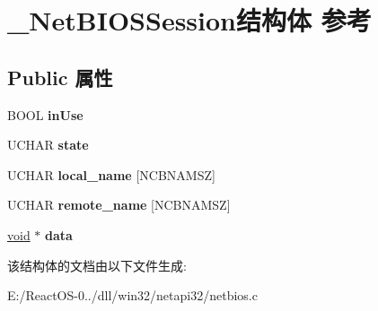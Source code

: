 \hypertarget{struct___net_b_i_o_s_session}{}\section{\+\_\+\+Net\+B\+I\+O\+S\+Session结构体 参考}
\label{struct___net_b_i_o_s_session}
\subsection*{Public 属性}
\begin{DoxyCompactItemize}
\item 
\mbox{\label{struct___net_b_i_o_s_session_a47a2e321c632eb7a09f6101a5eb21c66}} 
B\+O\+OL {\bfseries in\+Use}
\item 
\mbox{\label{struct___net_b_i_o_s_session_ae27addc496108168cb56939981b4244c}} 
U\+C\+H\+AR {\bfseries state}
\item 
\mbox{\label{struct___net_b_i_o_s_session_aa36bda85a1466bbd71a07382c4fd84bc}} 
U\+C\+H\+AR {\bfseries local\+\_\+name} \mbox{[}N\+C\+B\+N\+A\+M\+SZ\mbox{]}
\item 
\mbox{\label{struct___net_b_i_o_s_session_a19cadc247d5baa4f57ed57e2131fa43a}} 
U\+C\+H\+AR {\bfseries remote\+\_\+name} \mbox{[}N\+C\+B\+N\+A\+M\+SZ\mbox{]}
\item 
\mbox{\label{struct___net_b_i_o_s_session_a779b06568516d423b48e7f490632e5e1}} 
\hyperlink{interfacevoid}{void} $\ast$ {\bfseries data}
\end{DoxyCompactItemize}


该结构体的文档由以下文件生成\+:\begin{DoxyCompactItemize}
\item 
E\+:/\+React\+O\+S-\/0../dll/win32/netapi32/netbios.\+c\end{DoxyCompactItemize}

